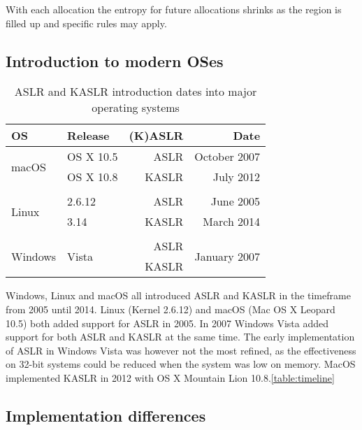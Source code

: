 With each allocation the entropy for future allocations shrinks as the region is filled up and specific rules may apply.

\subsection{Introduction to modern OSes}

\begin{table}[!ht]
    \small
    \centering
    \begin{tabular}{llrr}
    \hline
        \textbf{OS} & \textbf{Release} & \textbf{(K)ASLR} & \textbf{Date} \\ \hline
        \multirow{2}{*}{macOS}   & OS X 10.5              &  ASLR & October 2007 \\ 
                                 & OS X 10.8              & KASLR & July 2012    \\ \\
        \multirow{2}{*}{Linux}   & 2.6.12                 &  ASLR & June 2005    \\ 
                                 & 3.14                   & KASLR & March 2014   \\ \\
        \multirow{2}{*}{Windows} & \multirow{2}{*}{Vista} &  ASLR & \multirow{2}{*}{January 2007} \\
                                 &                        & KASLR & \\ \hline
    \end{tabular}
    \caption{ASLR and KASLR introduction dates into major operating systems{\cite[Figure~1]{drk}}}
    \label{table:timeline}
\end{table}

Windows, Linux and macOS all introduced ASLR and KASLR in the timeframe from 2005 until 2014.
Linux (Kernel 2.6.12) and macOS (Mac OS X Leopard 10.5) both added support for ASLR in 2005.
In 2007 Windows Vista added support for both ASLR and KASLR at the same time. The early implementation of ASLR in Windows Vista was however not the most refined, as the effectiveness on 32-bit systems could be reduced when the system was low on memory.
MacOS implemented KASLR in 2012 with OS X Mountain Lion 10.8.\autoref{table:timeline} \cite{drk}

\subsection{Implementation differences}

